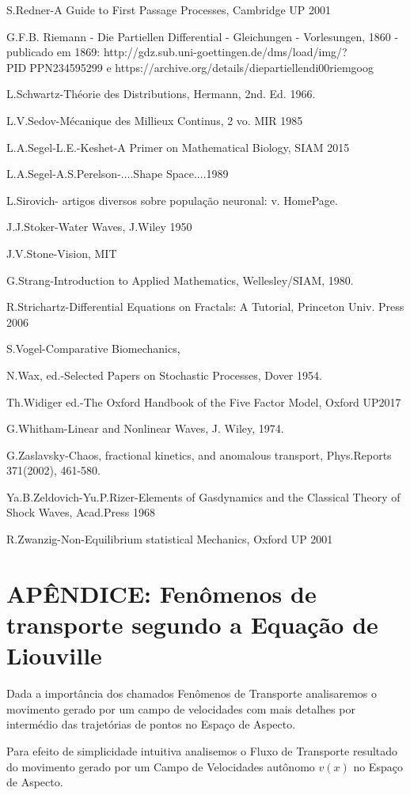 S.Redner-A Guide to First Passage Processes, Cambridge UP 2001

G.F.B. Riemann - Die Partiellen Differential - Gleichungen - Vorlesungen, 1860 - publicado em 1869: http://gdz.sub.uni-goettingen.de/dms/load/img/?PIDPPN234595299 e https://archive.org/details/diepartiellendi00riemgoog

L.Schwartz-Théorie des Distributions, Hermann, 2nd. Ed. 1966.

L.V.Sedov-Mécanique des Millieux Continus, 2 vo. MIR 1985

L.A.Segel-L.E.-Keshet-A Primer on Mathematical Biology, SIAM 2015

L.A.Segel-A.S.Perelson-....Shape Space....1989

L.Sirovich- artigos diversos sobre população neuronal: v. HomePage.

J.J.Stoker-Water Waves, J.Wiley 1950

J.V.Stone-Vision, MIT

G.Strang-Introduction to Applied Mathematics, Wellesley/SIAM, 1980.

R.Strichartz-Differential Equations on Fractals: A Tutorial, Princeton Univ. Press 2006

S.Vogel-Comparative Biomechanics,

N.Wax, ed.-Selected Papers on Stochastic Processes, Dover 1954.

Th.Widiger ed.-The Oxford Handbook of the Five Factor Model, Oxford UP2017

G.Whitham-Linear and Nonlinear Waves, J. Wiley, 1974.

G.Zaslavsky-Chaos, fractional kinetics, and anomalous transport, Phys.Reports 371(2002), 461-580.

Ya.B.Zeldovich-Yu.P.Rizer-Elements of Gasdynamics and the Classical Theory of Shock Waves, Acad.Press 1968

R.Zwanzig-Non-Equilibrium statistical Mechanics, Oxford UP 2001



\chapter{APÊNDICE: Fenômenos de transporte segundo a Equação de Liouville}


Dada a importância dos chamados Fenômenos de Transporte analisaremos o movimento gerado por um campo de velocidades com mais detalhes por intermédio das trajetórias de pontos no Espaço de Aspecto.

Para efeito de simplicidade intuitiva analisemos o Fluxo de Transporte resultado do movimento gerado por um Campo de Velocidades autônomo \(v(x)\) no Espaço de Aspecto.

